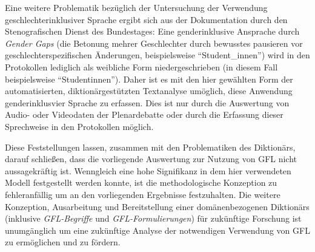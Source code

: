 \documentclass[12pt, 
    twoside=false, 
    bibliography=totoc, 
    numbers=endperiod, 
    headings=normal, 
    toc=chapterentrydotfill
    ]{scrbook}
\begin{document}
Eine weitere Problematik bezüglich der Untersuchung der Verwendung geschlechterinklusiver Sprache ergibt sich aus der Dokumentation durch den Stenografischen Dienst des Bundestages: Eine genderinklusive Ansprache durch \emph{Gender Gaps} (die Betonung mehrer Geschlechter durch bewusstes pausieren vor geschlechterspezifischen Änderungen, beispielsweise \enquote{Student\_innen}) wird in den Protokollen lediglich als weibliche Form niedergeschrieben (in diesem Fall beispielsweise \enquote{Studentinnen}). Daher ist es mit den hier gewählten Form der automatisierten, diktionärgestützten Textanalyse umöglich, diese Anwendung genderinklusvier Sprache zu erfassen.
Dies ist nur durch die Auswertung von Audio- oder Videodaten der Plenardebatte oder durch die Erfassung dieser Sprechweise in den Protokollen möglich.

Diese Feststellungen lassen, zusammen mit den Problematiken des Diktionärs, darauf schließen, dass die vorliegende Auswertung zur Nutzung von GFL nicht aussagekräftig ist. Wenngleich eine hohe Signifikanz in dem hier verwendeten Modell festgestellt werden konnte, ist die methodologische Konzeption zu fehleranfällig um an den vorliegenden Ergebnisse festzuhalten. Die weitere Konzeption, Ausarbeitung und Bereitstellung einer domänenbezogenen Diktionärs (inklusive \emph{GFL-Begriffe} und \emph{GFL-Formulierungen}) für zukünftige Forschung ist unumgänglich um eine zukünftige Analyse der notwendigen Verwendung von GFL zu ermöglichen und zu fördern.
\end{document}
